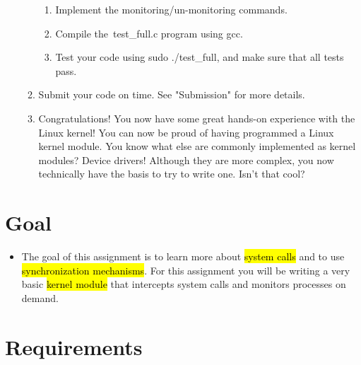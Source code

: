 \documentclass[12pt]{article}
\begin{document}
\begin{itemize}
\begin{enumerate}[1.]
\begin{enumerate}
            \item Implement the monitoring/un-monitoring commands.
            \item Compile the\ test\_full.c program using gcc.
            \item Test your code using sudo ./test\_full, and make sure that all tests pass.
        \end{enumerate}
        \item Submit your code on time. See "Submission" for more details.
        \item Congratulations! You now have some great hands-on experience with the Linux kernel! You can now be proud of having programmed a Linux kernel module. You know what else are commonly implemented as kernel modules? Device drivers! Although they are more complex, you now technically have the basis to try to write one. Isn't that cool?
    \end{enumerate}
\end{itemize}

\section{Goal}

\begin{itemize}
    \item

    The goal of this assignment is to learn more about \hl{system calls} and to use
    \hl{synchronization mechanisms}. For this assignment you will be writing a very
    basic \hl{kernel module} that intercepts system calls and monitors processes on
    demand.

\end{itemize}

\section{Requirements}
\end{document}
